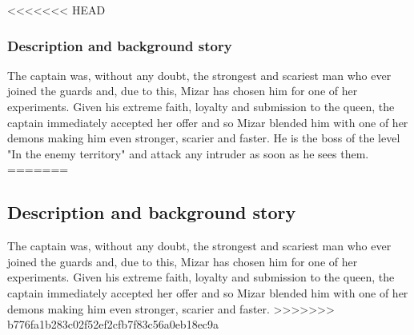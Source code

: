 <<<<<<< HEAD
\subsubsection{Description and background story}
The captain was, without any doubt, the strongest and scariest man who ever joined the guards and, due to this, Mizar has chosen him for one of her experiments. Given his extreme faith, loyalty and submission to the queen, the captain immediately accepted her offer and so Mizar blended him with one of her demons making him even stronger, scarier and faster. He is the boss of the level "In the enemy territory" and attack any intruder as soon as he sees them.
=======
\subsection{Description and background story}
The captain was, without any doubt, the strongest and scariest man who ever joined the guards and, due to this, Mizar has chosen him for one of her experiments. Given his extreme faith, loyalty and submission to the queen, the captain immediately accepted her offer and so Mizar blended him with one of her demons making him even stronger, scarier and faster.
>>>>>>> b776fa1b283c02f52ef2cfb7f83c56a0eb18ec9a

